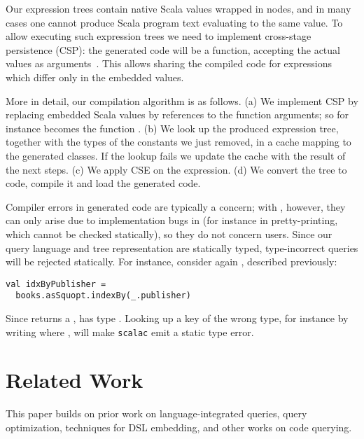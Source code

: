 Our expression trees contain native Scala values wrapped in  nodes,
and in many cases one cannot produce Scala program text evaluating to the same value.
To allow executing such expression trees we need to implement cross-stage
persistence (CSP): the generated code will be a function, accepting the actual
values as arguments~\citep{rompf2010lightweight}. This allows sharing the compiled
code for expressions which differ only in the embedded values.

More in detail, our compilation algorithm is as follows.
(a) We implement CSP by replacing embedded Scala values by references to the
function arguments; so for instance  becomes
the function .
(b) We look up the produced expression tree, together with the types of the
constants we just removed, in a cache mapping to the generated classes. If the
lookup fails we update the cache with the result of the next steps.
(c) We apply CSE on the expression.
(d) We convert the tree to code, compile it and load the generated code.

Compiler errors in generated code are typically a concern; with \LoS{}, however,
they can only arise due to implementation bugs in \LoS{} (for instance in
pretty-printing, which cannot be checked statically), so they do not concern
users.
Since our query language and tree representation are statically typed,
type-incorrect queries will be rejected statically.
For instance, consider again , described previously:
\begin{lstlisting}
val idxByPublisher =
  books.asSquopt.indexBy(_.publisher)
\end{lstlisting}
Since  returns a ,  has
type . Looking up a key of the wrong type, for
instance by writing  where , will
make \texttt{scalac} emit a static type error.



\section{Related Work}
\label{sec:relwork}
This paper builds on prior work on language-integrated queries, query optimization, techniques for DSL embedding, and other works on code querying.


